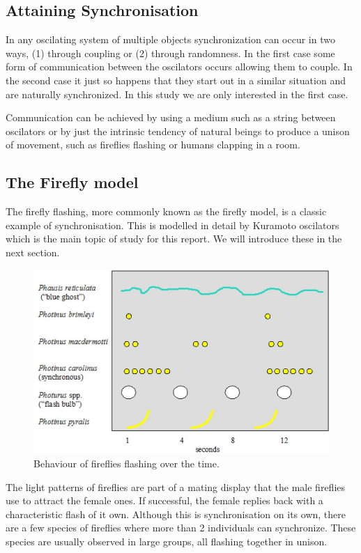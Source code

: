 \subsection{Attaining Synchronisation}

In any oscilating system of multiple objects synchronization can occur in two ways, (1) through coupling or (2) through randomness. In the first case some form of communication between the oscilators occurs allowing them to couple. In the second case it just so happens that they start out in a similar situation and are naturally synchronized. In this study we are only interested in the first case. 

Communication can be achieved by using a medium such as a string between oscilators or by just the intrinsic tendency of natural beings to produce a unison of movement, such as fireflies flashing or humans clapping in a room. 

\subsection{The Firefly model}

The firefly flashing, more commonly known as the firefly model, is a classic example of synchronisation. This is modelled in detail by Kuramoto oscilators which is the main topic of study for this report. We will introduce these in the next section. 

\begin{figure}[h]
	\centering
	\includegraphics[width=0.5\linewidth]{imgs/flash}
	\caption{Behaviour of fireflies flashing over the time. }
	\label{fig:intro_flash}
\end{figure}
 
The light patterns of fireflies are part of a mating display that the male fireflies use to attract the female ones. If successful, the female replies back with a characteristic flash of it own. Although this is synchronisation on its own, there are a few species of fireflies where more than 2 individuals can synchronize. These species are usually observed in large groups, all flashing together in unison.

